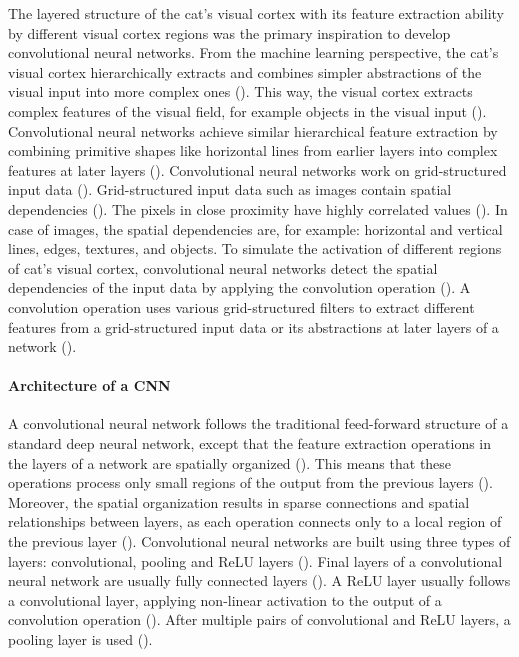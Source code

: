 \documentclass{BachelorBUI}
\begin{document}
        The layered structure of the cat's visual cortex with its feature extraction ability by different visual cortex regions was the primary inspiration to develop convolutional neural networks. From the machine learning perspective, the cat's visual cortex hierarchically extracts and combines simpler abstractions of the visual input into more complex ones (\cite{Aggarwal:2018}). This way, the visual cortex extracts complex features of the visual field, for example objects in the visual input (\cite{Aggarwal:2018}). Convolutional neural networks achieve similar hierarchical feature extraction by combining primitive shapes like horizontal lines from earlier layers into complex features at later layers (\cite{Aggarwal:2018}). Convolutional neural networks work on grid-structured input data (\cite{Aggarwal:2018}). Grid-structured input data such as images contain spatial dependencies (\cite{Aggarwal:2018}). The pixels in close proximity have highly correlated values (\cite{Bishop:2024}). In case of images, the spatial dependencies are, for example: horizontal and vertical lines, edges, textures, and objects. To simulate the activation of different regions of cat's visual cortex, convolutional neural networks detect the spatial dependencies of the input data by applying the convolution operation (\cite{Aggarwal:2018}). A convolution operation uses various grid-structured filters to extract different features from a grid-structured input data or its abstractions at later layers of a network (\cite{Aggarwal:2018}).

            \paragraph{Architecture of a CNN}

                A convolutional neural network follows the traditional feed-forward structure of a standard deep neural network, except that the feature extraction operations in the layers of a network are spatially organized (\cite{Aggarwal:2018}). This means that these operations process only small regions of the output from the previous layers (\cite{Aggarwal:2018}). Moreover, the spatial organization results in sparse connections and spatial relationships between layers, as each operation connects only to a local region of the previous layer (\cite{Aggarwal:2018}). Convolutional neural networks are built using three types of layers: convolutional, pooling and ReLU layers (\cite{Aggarwal:2018}). Final layers of a convolutional neural network are usually fully connected layers (\cite{Aggarwal:2018}). A ReLU layer usually follows a convolutional layer, applying non-linear activation to the output of a convolution operation (\cite{Aggarwal:2018}). After multiple pairs of convolutional and ReLU layers, a pooling layer is used (\cite{Aggarwal:2018}). 
                
\end{document}
